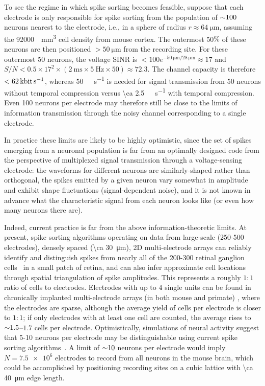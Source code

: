 To see the regime in which spike sorting becomes feasible, suppose that each electrode is only responsible for spike sorting from the population of ${\sim} \num{100}$ neurons nearest to the electrode, i.e., in a sphere of radius $r \approx \SI{64}{\micro\meter}$, assuming the \SI{92000}{\per\milli\meter\cubed} cell density from mouse cortex. The outermost \num{50}$\%$ of these neurons are then positioned $>\SI{50}{\micro\meter}$ from the recording site. For these outermost \num{50} neurons, the voltage SINR is $ < \num{100} e^{-\SI{50}{\micro\meter}/\SI{28}{\micro\meter}} \approx \num{17}$ and $S/N < 0.5 \times \num{17}^{\num{2}} \times (\SI{2}{\milli\second} \times \SI{5}{\hertz} \times 50) \approx \num{72.3}$. The channel capacity is therefore $< \SI{62}{\kilo\bit\per\second}$, whereas \SI{50}{\kilo\bit\per\second} is needed for signal transmission from \num{50} neurons without temporal compression versus \SI{\ca 2.5}{\kilo\bit\per\second} with temporal compression. Even 100 neurons per electrode may therefore still be close to the limits of information transmission through the noisy channel corresponding to a single electrode.

In practice these limits are likely to be highly optimistic, since the set of spikes emerging from a neuronal population is far from an optimally designed code from the perspective of multiplexed signal transmission through a voltage-sensing electrode: the waveforms for different neurons are similarly-shaped rather than orthogonal, the spikes emitted by a given neuron vary somewhat in amplitude and exhibit shape fluctuations (signal-dependent noise), and it is not known in advance what the characteristic signal from each neuron looks like (or even how many neurons there are). 

Indeed, current practice is far from the above information-theoretic limits. At present, spike sorting algorithms operating on data from large-scale (\num{250}-\num{500} electrodes), densely spaced (\SI{\ca 30}{\micro\meter}), 2D multi-electrode arrays can reliably identify and distinguish spikes from nearly all of the \num{200}-\num{300} retinal ganglion cells~\cite{marre12,pillow13} in a small patch of retina, and can also infer approximate cell locations through spatial triangulation of spike amplitudes.  This represents a roughly $1:1$ ratio of cells to electrodes. Electrodes with up to $4$ single units can be found in chronically implanted multi-electrode arrays (in both mouse and primate) \cite{costa2004differential, Nicolelis2003}, where the electrodes are sparse, although the average yield of cells per electrode is closer to $1:1$; if only electrodes with at least one cell are counted, the average rises to ${\sim} 1.5$--$1.7$ cells per electrode. Optimistically, simulations of neural activity suggest that \num{5}-\num{10} neurons per electrode may be distinguishable using current spike sorting algorithms~\cite{pedreira12,sahani99,camunas13}. A limit of ${\sim}\num{10}$ neurons per electrode would imply $N=\num{7.5e6}$ electrodes to record from all neurons in the mouse brain, which could be accomplished by positioning recording sites on a cubic lattice with \SI{\ca 40}{\micro\meter} edge length.

